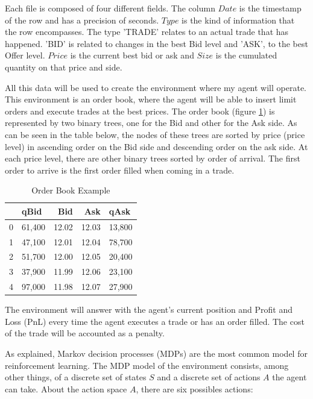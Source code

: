 \documentclass[a4paper]{article}
\begin{document}
Each file is composed of four different fields. The column $Date$ is the timestamp of the row and has a precision of seconds. $Type$ is the kind of information that the row encompasses. The type 'TRADE' relates to an actual trade that has happened. 'BID' is related to changes in the best Bid level and 'ASK', to the best Offer level. $Price$ is the current best bid or ask and $Size$ is the cumulated quantity on that price and side.

All this data will be used to create the environment where my agent will operate. This environment is an order book, where the agent will be able to insert limit orders and execute trades at the best prices. The order book (figure \ref{tab:order_book}) is represented by two binary trees, one for the Bid and other for the Ask side. As can be seen in the table below, the nodes of these trees are sorted by price (price level) in ascending order on the Bid side and descending order on the ask side. At each price level, there are other binary trees sorted by order of arrival. The first order to arrive is the first order filled when coming in a trade.


\begin{table}[ht!]
\centering
\begin{tabular}{l|lrrl}
{} &    qBid &    Bid &    Ask &    qAsk \\
\midrule
0 &  61,400 &  12.02 &  12.03 &  13,800 \\
1 &  47,100 &  12.01 &  12.04 &  78,700 \\
2 &  51,700 &  12.00 &  12.05 &  20,400 \\
3 &  37,900 &  11.99 &  12.06 &  23,100 \\
4 &  97,000 &  11.98 &  12.07 &  27,900 \\

\end{tabular}
\caption{\label{tab:order_book}Order Book Example}
\end{table}


The environment will answer with the agent's current position and Profit and Loss (PnL) every time the agent executes a trade or has an order filled. The cost of the trade will be accounted as a penalty.

As \cite{chan2001electronic} explained, Markov decision processes (MDPs) are the most common model for reinforcement learning.  The MDP model of the environment consists, among other things, of a discrete set of states $S$ and a discrete set of actions $A$ the agent can take. About the action space $A$, there are six possibles actions:
\end{document}
